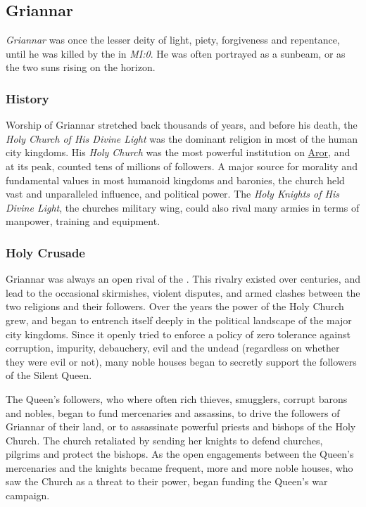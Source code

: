 \subsection{Griannar}
\label{sec:Griannar}

\emph{Griannar} was once the lesser deity of light, piety, forgiveness and
repentance, until he was killed by the  in
\emph{MI:0}. He was often portrayed as a sunbeam, or as the two suns rising on
the horizon.

\subsubsection{History}

Worship of Griannar stretched back thousands of years, and before his death,
the \emph{Holy Church of His Divine Light} was the dominant religion in most
of the human city kingdoms. His \emph{Holy Church} was the most powerful
institution on \hyperref[sec:Aror]{Aror}, and at its peak, counted tens of
millions of followers. A major source for morality and fundamental values in
most humanoid kingdoms and baronies, the church held vast and unparalleled
influence, and political power. The \emph{Holy Knights of His Divine Light},
the churches military wing, could also rival many armies in terms of manpower,
training and equipment.

\subsubsection{Holy Crusade}
\label{sec:Holy Crusade}

Griannar was always an open rival of the . This
rivalry existed over centuries, and lead to the occasional skirmishes, violent
disputes, and armed clashes between the two religions and their
followers. Over the years the power of the Holy Church grew, and began to
entrench itself deeply in the political landscape of the major city
kingdoms. Since it openly tried to enforce a policy of zero tolerance against
corruption, impurity, debauchery, evil and the undead (regardless on whether
they were evil or not), many noble houses began to secretly support the
followers of the Silent Queen.

The Queen's followers, who where often rich thieves, smugglers, corrupt barons
and nobles, began to fund mercenaries and assassins, to drive the followers of
Griannar of their land, or to assassinate powerful priests and bishops of the
Holy Church. The church retaliated by sending her knights to defend churches,
pilgrims and protect the bishops. As the open engagements between the Queen's
mercenaries and the knights became frequent, more and more noble houses, who
saw the Church as a threat to their power, began funding the Queen's war
campaign.

